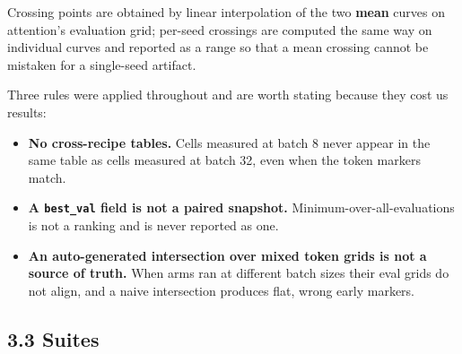 Crossing points are obtained by linear interpolation of the two \textbf{mean} curves on attention's
evaluation grid; per-seed crossings are computed the same way on individual curves and reported as
a range so that a mean crossing cannot be mistaken for a single-seed artifact.

Three rules were applied throughout and are worth stating because they cost us results:

\begin{itemize}
\tightlist
\item
  \textbf{No cross-recipe tables.} Cells measured at batch 8 never appear in the same table as cells
  measured at batch 32, even when the token markers match.
\item
  \textbf{A \texttt{best\_val} field is not a paired snapshot.} Minimum-over-all-evaluations is not a ranking
  and is never reported as one.
\item
  \textbf{An auto-generated intersection over mixed token grids is not a source of truth.} When arms
  ran at different batch sizes their eval grids do not align, and a naive intersection produces
  flat, wrong early markers.
\end{itemize}

\subsection{3.3 Suites}\label{suites}

